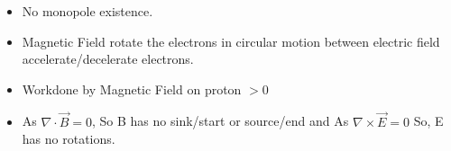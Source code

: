 \documentclass[10pt,landscape]{article}
\begin{document}
\begin{multicols*}{3}
\begin{itemize}
\begin{itemize}
                \item No monopole existence.\
                \item Magnetic Field rotate the electrons in circular motion between electric field accelerate/decelerate electrons.
                \item Workdone by Magnetic Field on proton $> 0$
                \item As $\nabla \cdot \vec{B} = 0$, So B has no sink/start or source/end and As $\nabla \times \vec{E} = 0$ So, E has no rotations.
    \end{itemize}
\end{itemize}

\end{multicols*}
\end{document}
